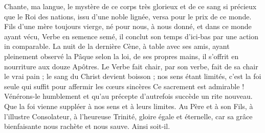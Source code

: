Chante, ma langue, le mystère de ce corps très glorieux
et de ce sang si précieux que le Roi des nations,
issu d'une noble lignée, versa pour le prix de ce monde.
\versseparator
Fils d'une mère toujours vierge, né pour nous,
à nous donné, et dans ce monde ayant vécu, Verbe en semence semé,
il conclut son temps d'ici-bas par une action in comparable.
\versseparator
La nuit de la dernière Cène, à table avec ses amis,
ayant pleinement observé la Pâque selon la loi, de ses propres mains,
il s'offrit en nourriture aux douze Apôtres.
\versseparator
Le Verbe fait chair, par son verbe, fait de sa chair le vrai pain ;
le sang du Christ devient boisson ;
nos sens étant limités, c'est la foi seule qui suffit pour affermir les cœurs sincères
\versseparator
Ce sacrement est admirable ! Vénérons-le humblement
et qu'au précepte d'autrefois succède un rite nouveau.
Que la foi vienne suppléer à nos sens et à leurs limites.
\versseparator
Au Père et à son Fils,
à l'illustre Consolateur,
à l'heureuse Trinité,
gloire égale et éternelle,
car sa grâce bienfaisante
nous rachète et nous sauve. Ainsi soit-il.

